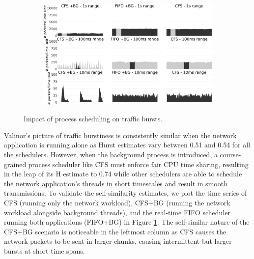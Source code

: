 \begin{figure}[t]
\centering
\begin{subfigure}[t]{0.90\linewidth}
    \centering
    \includegraphics[width=1\linewidth]{figs/sched_ts.pdf}
\end{subfigure}
\vspace{-1mm}
    \caption{\small{Impact of process scheduling on traffic bursts.}}
	\label{fig:sched}
 \vspace{-2mm}
\end{figure}

Valinor's picture of traffic burstiness is consistently similar when  the network application is running alone as Hurst estimates vary between 0.51 and 0.54 for all the schedulers. However, when the background process is introduced, a course-grained process scheduler like CFS must enforce fair CPU time sharing, resulting in the leap of its H estimate to 0.74 while other schedulers are able to schedule the network application's threads in short timescales and result in smooth transmissions. To validate the self-similarity estimates, we plot the time series of CFS (running only the network workload), CFS+BG (running the network workload alongside background threads), and the real-time FIFO scheduler running both applications (FIFO+BG) in Figure \ref{fig:sched}. The self-similar nature of the CFS+BG scenario is noticeable in the leftmost column as CFS causes the network packets to be sent in larger chunks, causing intermittent but larger bursts at short time spans.

